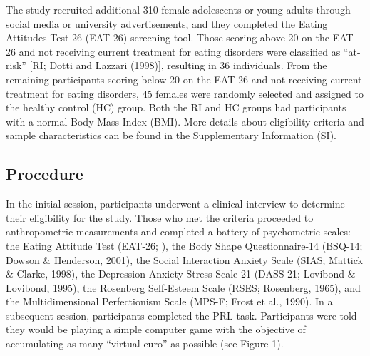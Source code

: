 \documentclass[
  man,floatsintext]{apa6}
\begin{document}
The study recruited additional 310 female adolescents or young adults through social media or university advertisements, and they completed the Eating Attitudes Test-26 (EAT-26) screening tool. Those scoring above 20 on the EAT-26 and not receiving current treatment for eating disorders were classified as ``at-risk'' {[}RI; Dotti and Lazzari (1998){]}, resulting in 36 individuals. From the remaining participants scoring below 20 on the EAT-26 and not receiving current treatment for eating disorders, 45 females were randomly selected and assigned to the healthy control (HC) group. Both the RI and HC groups had participants with a normal Body Mass Index (BMI). More details about eligibility criteria and sample characteristics can be found in the Supplementary Information (SI).

\hypertarget{procedure}{%
\subsection{Procedure}\label{procedure}}

In the initial session, participants underwent a clinical interview to determine their eligibility for the study. Those who met the criteria proceeded to anthropometric measurements and completed a battery of psychometric scales: the Eating Attitude Test (EAT-26; ), the Body Shape Questionnaire-14 (BSQ-14; Dowson \& Henderson, 2001), the Social Interaction Anxiety Scale (SIAS; Mattick \& Clarke, 1998), the Depression Anxiety Stress Scale-21 (DASS-21; Lovibond \& Lovibond, 1995), the Rosenberg Self-Esteem Scale (RSES; Rosenberg, 1965), and the Multidimensional Perfectionism Scale (MPS-F; Frost et al., 1990). In a subsequent session, participants completed the PRL task. Participants were told they would be playing a simple computer game with the objective of accumulating as many ``virtual euro'' as possible (see Figure 1).
\end{document}
